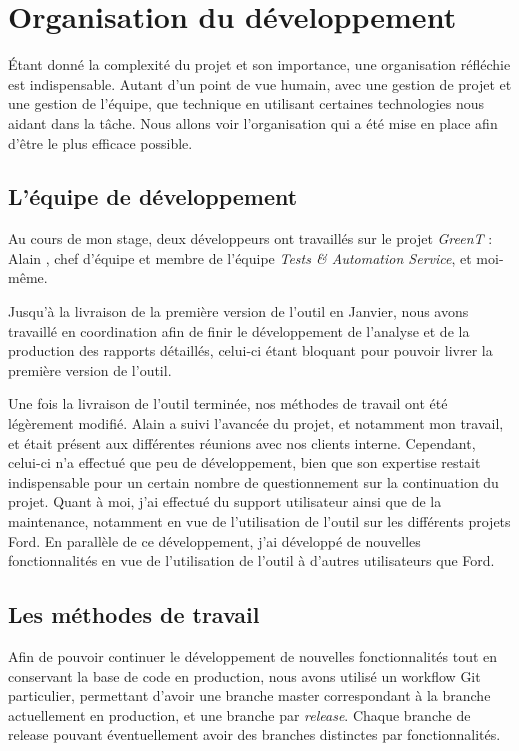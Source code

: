 \chapter{Organisation du développement}\label{chapOrganization}
\putminitoc \'Etant donné la complexité du projet et son importance, une organisation réfléchie est indispensable. Autant d'un point de vue humain, avec une gestion de projet et une gestion de l'équipe, que technique en utilisant certaines technologies nous aidant dans la tâche.  Nous allons voir l'organisation qui a été mise en place afin d'être le plus efficace possible.

\vspace{-25px}
\section{L'équipe de développement}
Au cours de mon stage, deux développeurs ont travaillés sur le projet \textit{GreenT} : Alain , chef d’équipe et membre de l’équipe \textit{Tests \& Automation Service}, et moi-même.

Jusqu'à la livraison de la première version de l'outil en Janvier, nous avons travaillé en coordination afin de finir le développement de l'analyse et de la production des rapports détaillés, celui-ci étant bloquant pour pouvoir livrer la première version de l'outil. 

Une fois la livraison de l'outil terminée, nos méthodes de travail ont été légèrement modifié. Alain a suivi l'avancée du projet, et notamment mon travail, et était présent aux différentes réunions avec nos clients interne. Cependant, celui-ci n'a effectué que peu de développement, bien que son expertise restait indispensable pour un certain nombre de questionnement sur la continuation du projet. Quant à moi, j'ai effectué du support utilisateur ainsi que de la maintenance, notamment en vue de l'utilisation de l'outil sur les différents projets Ford. En parallèle de ce développement, j'ai développé de nouvelles fonctionnalités en vue de l'utilisation de l'outil à d'autres utilisateurs que Ford.

\section{Les méthodes de travail}
Afin de pouvoir continuer le développement de nouvelles fonctionnalités tout en conservant la base de code en production, nous avons utilisé un workflow Git particulier, permettant d'avoir une branche master correspondant à la branche actuellement en production, et une branche par \textit{release}. Chaque branche de release pouvant éventuellement avoir des branches distinctes par fonctionnalités. 


